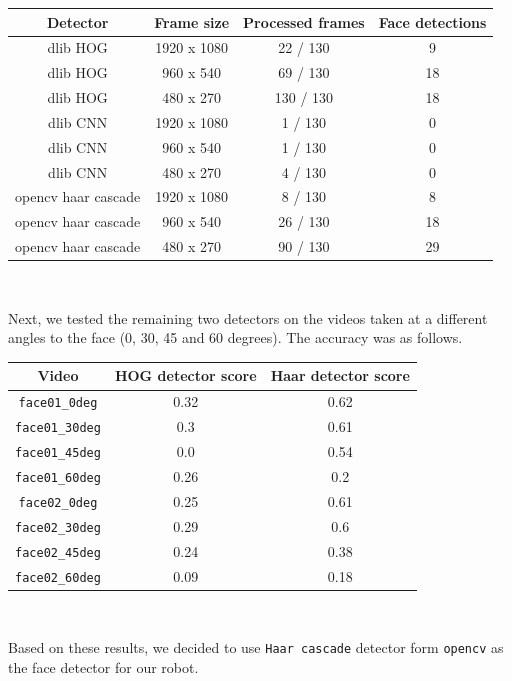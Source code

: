 \documentclass[12pt,a4paper]{article}
\begin{document}
	\begin{center}
		\begin{tabular}{|c|c|c|c|}
			\hline 
			Detector & Frame size & Processed frames & Face detections \\ 
			\hline
			dlib HOG & 1920 x 1080 & 22 / 130 & 9 \\
			dlib HOG & 960 x 540 & 69 / 130 & 18 \\
			dlib HOG & 480 x 270 & 130 / 130 & 18 \\
			dlib CNN & 1920 x 1080 & 1 / 130 & 0 \\
			dlib CNN & 960 x 540 & 1 / 130 & 0 \\
			dlib CNN & 480 x 270 & 4 / 130 & 0 \\
			opencv haar cascade & 1920 x 1080 & 8 / 130 & 8 \\
			opencv haar cascade & 960 x 540 & 26 / 130 & 18 \\
			opencv haar cascade & 480 x 270 & 90 / 130 & 29 \\
			\hline 
		\end{tabular} \\
	\end{center}

	Next, we tested the remaining two detectors on the videos taken at a different angles to the face (0, 30, 45 and 60 degrees). The accuracy was as follows. \\

	\begin{center}
		\begin{tabular}{|c|c|c|}
			\hline 
			Video & HOG detector score & Haar detector score \\
			\hline
			\texttt{face01\_0deg} & 0.32 & 0.62 \\
			\texttt{face01\_30deg} & 0.3 & 0.61 \\
			\texttt{face01\_45deg} & 0.0 & 0.54 \\
			\texttt{face01\_60deg} & 0.26 & 0.2 \\
			\texttt{face02\_0deg} & 0.25 & 0.61 \\
			\texttt{face02\_30deg} & 0.29 & 0.6 \\
			\texttt{face02\_45deg} & 0.24 & 0.38 \\
			\texttt{face02\_60deg} & 0.09 & 0.18 \\
			\hline 
		\end{tabular} \\
	\end{center}

	Based on these results, we decided to use \texttt{Haar cascade} detector form \texttt{opencv} as the face detector for our robot. \\
\end{document}
